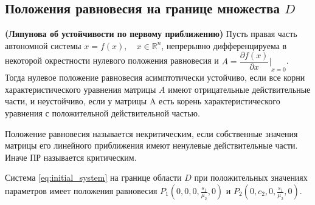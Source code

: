 \documentclass[14pt,a4paper]{extarticle}
\begin{document}
	\subsection{Положения равновесия на границе множества $D$}
	
	\begin{theorem}\textbf{(Ляпунова об устойчивости по первому приближению)}
		Пусть правая часть автономной системы $x =f(x),\quad x\in\mathbb{R}^n$, непрерывно дифференцируема в некоторой окрестности нулевого положения равновесия и $A = {\dfrac{\partial f(x)}{\partial x}\biggr\rvert}_{x=0}$. Тогда нулевое положение равновесия асимптотически устойчиво, если все корни характеристического уравнения матрицы $A$ имеют отрицательные действительные части, и неустойчиво, если у матрицы A есть корень характеристического уравнения с положительной действительной частью.
	\end{theorem}
	
	\begin{definition}
		Положение равновесия называется некритическим, если собственные значения матрицы его линейного приближения имеют ненулевые действительные части. Иначе ПР называется критическим. 
	\end{definition}
	
	\begin{theorem}
		Система \ref{eq:initial_system} на границе области $D$ при положительных значениях параметров имеет положения равновесия $P_1\left(0,0,0,\frac{s_1}{\mu_2},0\right)$ и $P_2\left(0,c_2,0,\frac{s_1}{\mu_2},0\right)$. 
	\end{theorem}
	
\end{document}
